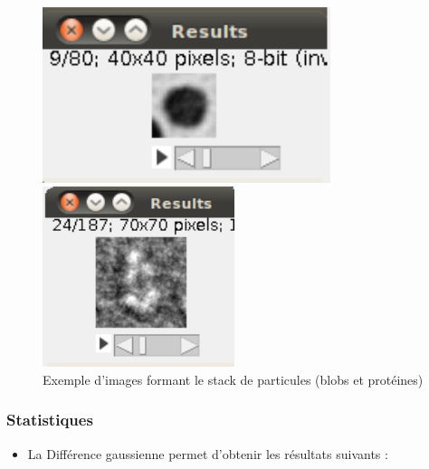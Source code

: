 \begin{figure}[!ht]
\begin{center}
 \begin{minipage}{.450\linewidth}
  \includegraphics[width=0.75\textwidth]{cropblob.png}  
 \end{minipage} \hfill
\begin{minipage}{.450\linewidth}
  \includegraphics[width=0.5\textwidth]{cropprotDog.png}   
 \end{minipage} \hfill
\caption{Exemple d'images formant le stack de particules (blobs et protéines)}
\end{center}
\end{figure}

\subsubsection*{Statistiques}

\begin{itemize}{•}
\item La Différence gaussienne permet d'obtenir les résultats suivants :
\end{itemize}

